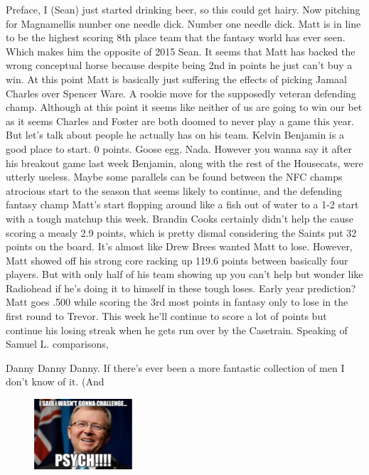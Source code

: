 \documentclass[11pt,letterpaper]{article}
\begin{document}
\newpage
{}
\par\noindent Preface, I (Sean) just started drinking beer, so this could get hairy. Now pitching for Magnamellis number one needle dick. Number one needle dick. Matt is in line to be the highest scoring 8th place team that the fantasy world has ever seen. Which makes him the opposite of 2015 Sean. It seems that Matt has backed the wrong conceptual horse because despite being 2nd in points he just can't buy a win. At this point Matt is basically just suffering the effects of picking Jamaal Charles over Spencer Ware. A rookie move for the supposedly veteran defending champ. Although at this point it seems like neither of us are going to win our bet as it seems Charles and Foster are both doomed to never play a game this year. But let's talk about people he actually has on his team. Kelvin Benjamin is a good place to start. 0 points. Goose egg. Nada. However you wanna say it after his breakout game last week Benjamin, along with the rest of the Housecats, were utterly useless. Maybe some parallels can be found between the NFC champs atrocious start to the season that seems likely to continue, and the defending fantasy champ Matt's start flopping around like a fish out of water to a 1-2 start with a tough matchup this week. Brandin Cooks certainly didn't help the cause scoring a measly 2.9 points, which is pretty dismal considering the Saints put 32 points on the board. It's almost like Drew Brees wanted Matt to lose. However, Matt showed off his strong core racking up 119.6 points between basically four players. But with only half of his team showing up you can't help but wonder like Radiohead if he's doing it to himself in these tough loses. Early year prediction? Matt goes .500 while scoring the 3rd most points in fantasy only to lose in the first round to Trevor. This week he'll continue to score a lot of points but continue his losing streak when he gets run over by the Casetrain. Speaking of Samuel L. comparisons, 
\bigskip
\par\noindent Danny Danny Danny. If there's ever been a more fantastic collection of men I don't know of it. (And 
\begin{figure}
\centering
\includegraphics[width=0.325\textwidth]{week3-aussie.png}
\label{fig:week3-aussie}
\end{figure} 
\end{document}
